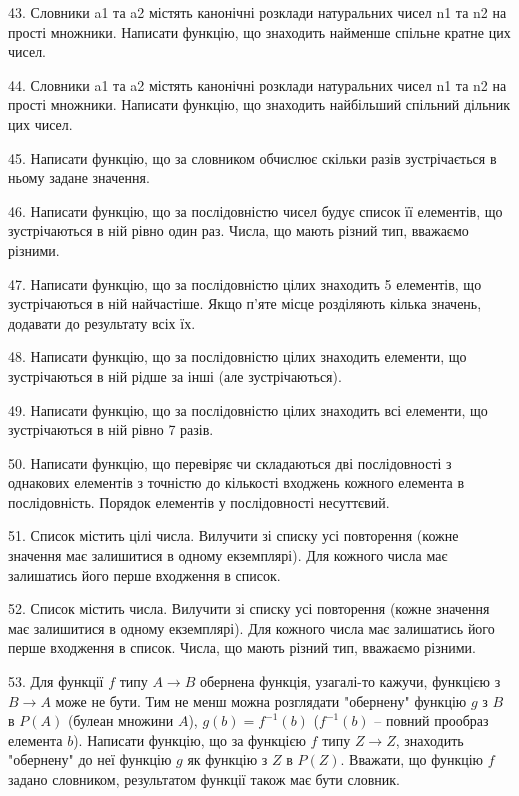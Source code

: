 \documentclass[10pt, ukrainian]{article}
\begin{document}
{\begin {Large}
43. Словники a1 та a2 містять канонічні розклади натуральних чисел n1 та n2 на прості множники. Написати функцію, що знаходить найменше спільне кратне цих чисел.

44. Словники a1 та a2 містять канонічні розклади натуральних чисел n1 та n2 на прості множники. Написати функцію, що знаходить найбільший спільний дільник цих чисел.

45. Написати функцію, що за словником обчислює скільки разів зустрічається в ньому задане значення.

46. Написати функцію, що за послідовністю чисел будує список її елементів, що зустрічаються в ній рівно один раз. Числа, що мають різний тип, вважаємо різними.

\newpage

47. Написати функцію, що за послідовністю цілих знаходить 5 елементів, що зустрічаються в ній найчастіше. Якщо п’яте місце розділяють кілька значень, додавати до результату всіх їх. 

48. Написати функцію, що за послідовністю цілих знаходить елементи, що зустрічаються в ній рідше за інші (але зустрічаються). 

49. Написати функцію, що за послідовністю цілих знаходить всі елементи, що зустрічаються в ній рівно 7 разів. 

50. Написати функцію, що перевіряє чи складаються дві послідовності з однакових елементів з точністю до кількості входжень кожного елемента в послідовність. Порядок елементів у послідовності несуттєвий.

51. Список містить цілі числа. Вилучити зі списку усі повторення (кожне значення має залишитися в одному екземплярі). Для кожного числа має залишатись його перше входження в список.

52. Список містить числа. Вилучити зі списку усі повторення (кожне значення має залишитися в одному екземплярі). Для кожного числа має залишатись його перше входження в список. Числа, що мають різний тип, вважаємо різними.

53. Для функції $f$ типу $A\rightarrow B$ обернена функція, узагалі-то кажучи, функцією з $B\rightarrow A$ може не бути. Тим не менш можна розглядати "обернену" функцію $g$ з $B$ в $P(A)$ (булеан множини $A$), $g\left(b\right)=f^{-1}\left(b\right)$ ($f^{-1}\left(b\right)$ -- повний прообраз елемента $b$). Написати функцію, що за функцією $f$  типу $Z\rightarrow Z$, знаходить "обернену" до неї функцію $g$ як функцію з $Z$ в $P(Z)$. Вважати, що функцію $f$ задано словником, результатом функції також має бути словник.


\end{Large}}
\end{document}
